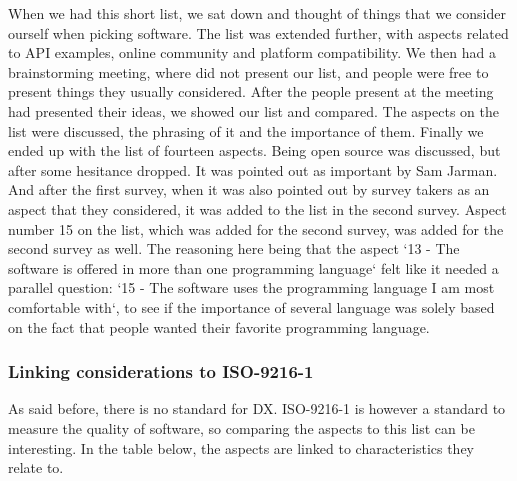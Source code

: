 \documentclass[11pt]{article}
\begin{document}
\begin{multicols}{2}
    When we had this short list, we sat down and thought of things that we
    consider ourself when picking software. The list was extended further,
    with aspects related to API examples, online community and  platform compatibility.
    We then had a brainstorming meeting, where did not present our list, and people
    were free to present things they usually considered. After the people present
    at the meeting had presented their ideas, we showed our list and compared.
    The aspects on the list were discussed, the phrasing of it and the importance
    of them. Finally we ended up with the list of fourteen aspects.
    Being open source was discussed, but after some hesitance dropped. It
    was pointed out as important by Sam Jarman. And after the first survey, when it was
    also pointed out by survey takers as an aspect that they considered, it was
    added to the list in the second survey.
    Aspect number 15 on the list, which was added for the second survey, was
    added for the second survey as well. The reasoning here being that the aspect
    `13 - The software is offered in more than one programming language` felt
    like it needed a parallel question: `15 - The software uses the programming language I am most comfortable with`,
    to see if the importance of several language was solely based on the fact that
    people wanted their favorite programming language.


    \subsubsection{Linking considerations to ISO-9216-1}

    As said before, there is no standard for DX. ISO-9216-1 is however a standard
    to measure the quality of software, so comparing the aspects to this list can
    be interesting. In the table below, the aspects are linked to characteristics they relate to.


\end{multicols}
\end{document}
